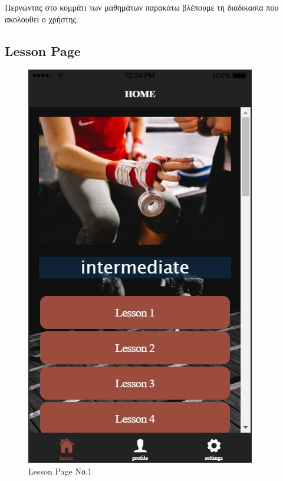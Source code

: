 \documentclass[a4paper,12pt]{article}
\begin{document}
			Περνώντας στο κομμάτι των μαθημάτων παρακάτω βλέπουμε τη διαδικασία που ακολουθεί ο χρήστης.
			\subsection{Lesson Page}
			\clearpage
			\begin{figure}[!htb]
				\caption{Lesson Page Νο.1}
				\vspace*{0.5cm}

				  \includegraphics[width=\linewidth]{home2}
				  

\end{figure}
\end{document}
